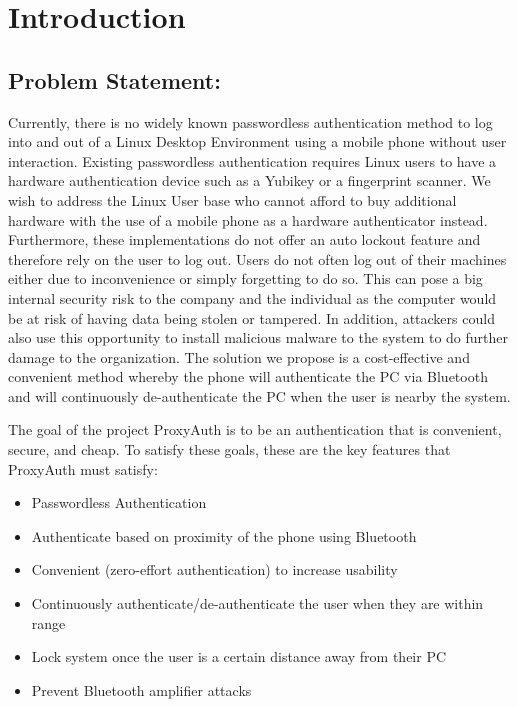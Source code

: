 \documentclass[letterpaper,twocolumn,10pt]{article}
\begin{document}
\section{Introduction} 

\subsection{Problem Statement:}
Currently, there is no widely known passwordless authentication method to log into and out of a Linux Desktop Environment using a mobile phone without user interaction. Existing passwordless authentication requires Linux users to have a hardware authentication device such as a Yubikey or a fingerprint scanner. We wish to address the Linux User base who cannot afford to buy additional hardware with the use of a mobile phone as a hardware authenticator instead. Furthermore, these implementations do not offer an auto lockout feature and therefore rely on the user to log out. Users do not often log out of their machines either due to inconvenience or simply forgetting to do so. This can pose a big internal security risk to the company and the individual as the computer would be at risk of having data being stolen or tampered. In addition, attackers could also use this opportunity to install malicious malware to the system to do further damage to the organization. The solution we propose is a cost-effective and convenient method whereby the phone will authenticate the PC via Bluetooth and will continuously de-authenticate the PC when the user is nearby the system.

The goal of the project ProxyAuth is to be an authentication that is convenient, secure, and cheap. To satisfy these goals, these are the key features that ProxyAuth must satisfy:

\begin{singlespace}
\begin{itemize}[noitemsep]
\itemsep0em 
\item Passwordless Authentication
\item Authenticate based on proximity of the phone using Bluetooth
\item Convenient (zero-effort authentication) to increase usability
\item Continuously authenticate/de-authenticate the user when they are within range
\item Lock system once the user is a certain distance away from their PC
\item Prevent Bluetooth amplifier attacks
\end{itemize}
\end{singlespace}
\end{document}
